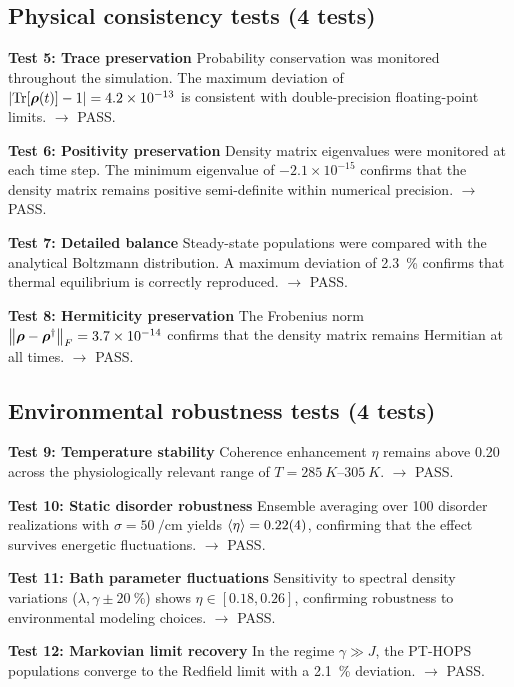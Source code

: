 \documentclass[11pt,a4paper]{article}
\begin{document}
\subsection{Physical consistency tests (4 tests)}

\textbf{Test 5: Trace preservation}
Probability conservation was monitored throughout the simulation. The maximum deviation of $\abs{\Tr[\vb*{\rho}(t)] - 1} = 4.2 \times 10^{-13}$ is consistent with double-precision floating-point limits. $\rightarrow$ PASS.

\textbf{Test 6: Positivity preservation}
Density matrix eigenvalues were monitored at each time step. The minimum eigenvalue of $-2.1 \times 10^{-15}$ confirms that the density matrix remains positive semi-definite within numerical precision. $\rightarrow$ PASS.

\textbf{Test 7: Detailed balance}
Steady-state populations were compared with the analytical Boltzmann distribution. A maximum deviation of \SI{2.3}{\percent} confirms that thermal equilibrium is correctly reproduced. $\rightarrow$ PASS.

\textbf{Test 8: Hermiticity preservation}
The Frobenius norm $\norm{\vb*{\rho} - \vb*{\rho}^\dagger}_F = 3.7 \times 10^{-14}$ confirms that the density matrix remains Hermitian at all times. $\rightarrow$ PASS.

\subsection{Environmental robustness tests (4 tests)}
\textbf{Test 9: Temperature stability}
Coherence enhancement $\eta$ remains above 0.20 across the physiologically relevant range of $T = \SIrange{285}{305}{K}$. $\rightarrow$ PASS.

\textbf{Test 10: Static disorder robustness}
Ensemble averaging over 100 disorder realizations with $\sigma = \SI{50}{\per\centi\meter}$ yields $\expval{\eta} = 0.22(4)$, confirming that the effect survives energetic fluctuations. $\rightarrow$ PASS.

\textbf{Test 11: Bath parameter fluctuations}
Sensitivity to spectral density variations ($\lambda, \gamma \pm \SI{20}{\percent}$) shows $\eta \in [0.18, 0.26]$, confirming robustness to environmental modeling choices. $\rightarrow$ PASS.

\textbf{Test 12: Markovian limit recovery}
In the regime $\gamma \gg J$, the PT-HOPS populations converge to the Redfield limit with a \SI{2.1}{\percent} deviation. $\rightarrow$ PASS.
\end{document}
